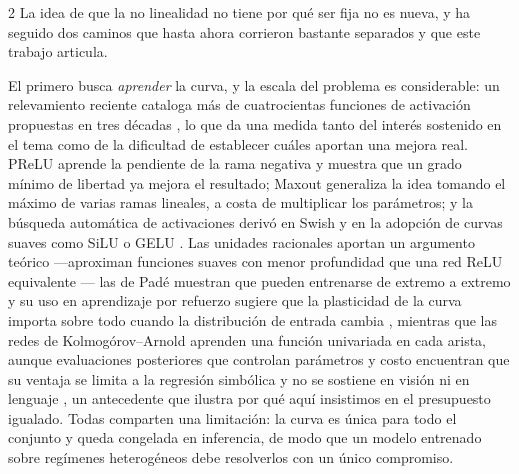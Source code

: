 \begin{multicols}{2}
La idea de que la no linealidad no tiene por qué ser fija no es nueva, y ha seguido dos caminos que hasta ahora corrieron bastante separados y que este trabajo articula.

El primero busca \textit{aprender} la curva, y la escala del problema es considerable: un relevamiento reciente cataloga más de cuatrocientas funciones de activación propuestas en tres décadas \cite{kunc2024threedecades}, lo que da una medida tanto del interés sostenido en el tema como de la dificultad de establecer cuáles aportan una mejora real. PReLU \cite{he2015prelu} aprende la pendiente de la rama negativa y muestra que un grado mínimo de libertad ya mejora el resultado; Maxout \cite{goodfellow2013maxout} generaliza la idea tomando el máximo de varias ramas lineales, a costa de multiplicar los parámetros; y la búsqueda automática de activaciones \cite{ramachandran2017swish} derivó en Swish y en la adopción de curvas suaves como SiLU \cite{silu} o GELU \cite{hendrycks2016gelu}. Las unidades racionales aportan un argumento teórico —aproximan funciones suaves con menor profundidad que una red ReLU equivalente \cite{boulle2020rational}— las de Padé muestran que pueden entrenarse de extremo a extremo \cite{molina2020pade} y su uso en aprendizaje por refuerzo sugiere que la plasticidad de la curva importa sobre todo cuando la distribución de entrada cambia \cite{delfosse2024adaptive}, mientras que las redes de Kolmogórov--Arnold \cite{liu2024kan} aprenden una función univariada en cada arista, aunque evaluaciones posteriores que controlan parámetros y costo encuentran que su ventaja se limita a la regresión simbólica y no se sostiene en visión ni en lenguaje \cite{hou2024kanassessment}, un antecedente que ilustra por qué aquí insistimos en el presupuesto igualado. Todas comparten una limitación: la curva es única para todo el conjunto y queda congelada en inferencia, de modo que un modelo entrenado sobre regímenes heterogéneos debe resolverlos con un único compromiso.


\end{multicols}
